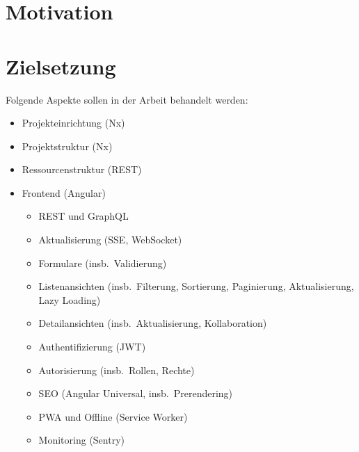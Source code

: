 
\section{Motivation}\label{sec:motivation}

\section{Zielsetzung}\label{sec:zielsetzung}

Folgende Aspekte sollen in der Arbeit behandelt werden:

\begin{itemize}
    \item Projekteinrichtung (Nx)
    \item Projektstruktur (Nx)
    \item Ressourcenstruktur (REST)
    \item Frontend (Angular)
    \begin{itemize}
        \item REST und GraphQL
        \item Aktualisierung (SSE, WebSocket)
        \item Formulare (insb.\ Validierung)
        \item Listenansichten (insb.\ Filterung, Sortierung, Paginierung, Aktualisierung, Lazy Loading)
        \item Detailansichten (insb.\ Aktualisierung, Kollaboration)
        \item Authentifizierung (JWT)
        \item Autorisierung (insb.\ Rollen, Rechte)
        \item SEO (Angular Universal, insb.\ Prerendering)
        \item PWA und Offline (Service Worker)
        \item Monitoring (Sentry)

\end{itemize}
\end{itemize}

